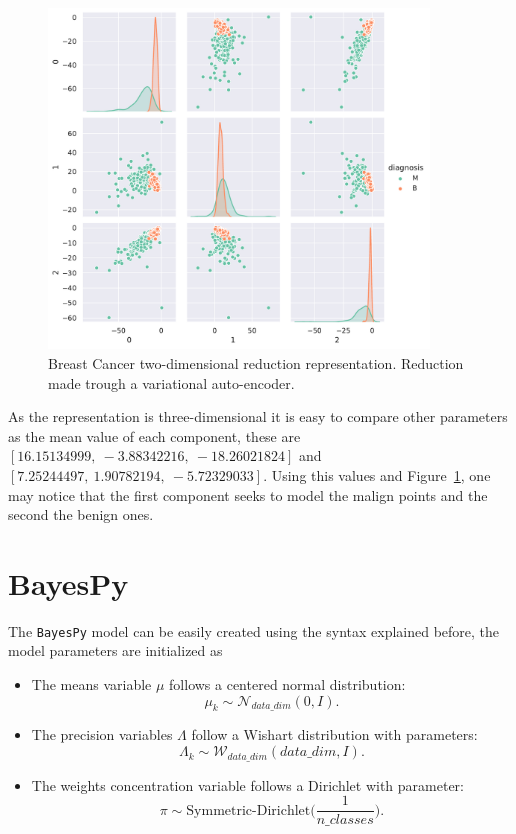 \begin{figure}[h!]
  \centering
  \includegraphics[width=0.9\textwidth]{tex/images/breast_vae_3D_mixture.pdf}
  \caption{Breast Cancer two-dimensional reduction representation. Reduction made trough a variational auto-encoder.}\label{fig:vae_mix_breast}
\end{figure}

As the representation is three-dimensional it is easy to compare other parameters as the mean value of each component, these are \([ 16.15134999,\  -3.88342216,\ -18.26021824]\) and \([7.25244497,\   1.90782194,\  -5.72329033]\). Using this values and Figure~\ref{fig:vae_mix_breast}, one may notice that the first component seeks to model the malign points and the second the benign ones.

\newpage
\section{BayesPy}

The \texttt{BayesPy} model can be easily created using the syntax explained before, the model parameters are initialized as
\begin{itemize}
  \item The means variable $\mu$ follows a centered normal distribution:
  $$\mu_k \sim \mathcal{N}_{data\_dim}(0,I).$$
  \item The precision variables $\Lambda$ follow a Wishart distribution with parameters:
  $$\Lambda_k \sim \mathcal{W}_{data\_dim}(data\_dim, I).$$
  \item The weights concentration variable follows a Dirichlet with parameter:
  $$ \pi \sim \text{Symmetric-Dirichlet}\Big(\frac{1}{n\_classes}\Big).$$
\end{itemize}

